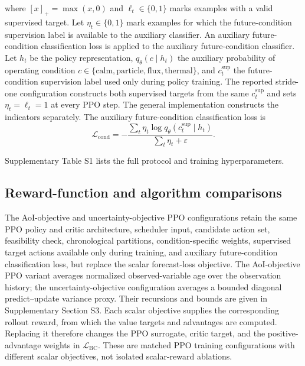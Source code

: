 where $[x]_+=\max(x,0)$ and $\ell_t\in\{0,1\}$ marks examples with a valid
supervised target. Let $\eta_t\in\{0,1\}$ mark examples for which the
future-condition supervision label is available to the auxiliary classifier. An
auxiliary future-condition classification loss is applied to the auxiliary
future-condition classifier. Let
$h_t$ be the policy representation, $q_{\theta}(c\mid h_t)$ the auxiliary
probability of operating condition
$c\in\{\mathrm{calm},\mathrm{particle},\mathrm{flux},\mathrm{thermal}\}$, and
$c_t^{\mathrm{sup}}$ the future-condition supervision label used only during policy
training. The reported stride-one configuration constructs both supervised
targets from the same $c_t^{\mathrm{sup}}$ and sets
$\eta_t=\ell_t=1$ at every PPO step. The general
implementation constructs the indicators separately. The auxiliary future-condition classification loss is
\begin{equation}
  \mathcal{L}_{\mathrm{cond}}
  =
  -
  \frac{
  \sum_t \eta_t \log q_{\theta}(c_t^{\mathrm{sup}}\mid h_t)
  }{
  \sum_t \eta_t + \varepsilon
  } .
  \label{eq:event_aux_loss}
\end{equation}

Supplementary Table S1 lists the full protocol and training hyperparameters.
\subsection{Reward-function and algorithm comparisons}
\label{sec:matched_controls}

The AoI-objective and uncertainty-objective PPO configurations retain the same PPO
policy and critic architecture, scheduler input, candidate action set, feasibility check,
chronological partitions, condition-specific weights, supervised target actions
available only during training, and auxiliary future-condition classification loss, but
replace the scalar forecast-loss objective. The AoI-objective PPO variant averages normalized
observed-variable age over the observation history; the uncertainty-objective
configuration averages a bounded diagonal predict--update variance proxy. Their
recursions and bounds are given in
Supplementary Section S3.
Each scalar objective supplies the corresponding rollout reward, from which the
value targets and advantages are computed. Replacing it therefore changes the
PPO surrogate, critic target, and the positive-advantage weights in
$\mathcal{L}_{\mathrm{BC}}$. These are matched PPO training configurations with
different scalar objectives, not isolated scalar-reward ablations.

